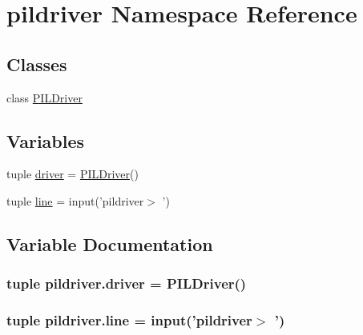 \hypertarget{namespacepildriver}{\section{pildriver Namespace Reference}
\label{namespacepildriver}
}
\subsection*{Classes}
\begin{DoxyCompactItemize}
\item 
class \hyperlink{classpildriver_1_1_p_i_l_driver}{P\-I\-L\-Driver}
\end{DoxyCompactItemize}
\subsection*{Variables}
\begin{DoxyCompactItemize}
\item 
tuple \hyperlink{namespacepildriver_a24873a941afb05a4dc6aa1447076baf3}{driver} = \hyperlink{classpildriver_1_1_p_i_l_driver}{P\-I\-L\-Driver}()
\item 
tuple \hyperlink{namespacepildriver_a420f50a43acdc380932b8f204f682f88}{line} = input('pildriver$>$ ')
\end{DoxyCompactItemize}


\subsection{Variable Documentation}
\hypertarget{namespacepildriver_a24873a941afb05a4dc6aa1447076baf3}{
\subsubsection[{driver}]{\setlength{\rightskip}{0pt plus 5cm}tuple pildriver.\-driver = {\bf P\-I\-L\-Driver}()}}\label{namespacepildriver_a24873a941afb05a4dc6aa1447076baf3}
\hypertarget{namespacepildriver_a420f50a43acdc380932b8f204f682f88}{
\subsubsection[{line}]{\setlength{\rightskip}{0pt plus 5cm}tuple pildriver.\-line = input('pildriver$>$ ')}}\label{namespacepildriver_a420f50a43acdc380932b8f204f682f88}
